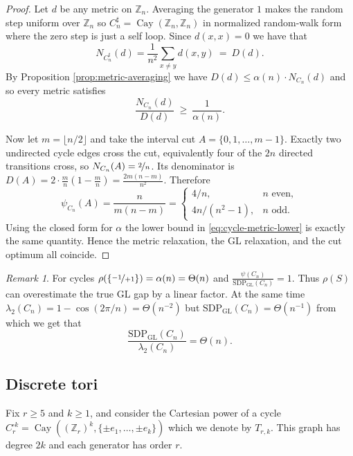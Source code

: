 \documentclass[11pt]{article}
\theoremstyle{definition}
\theoremstyle{remark}
\newtheorem{remark}[theorem]{Remark}
\newcommand{\Z}{\mathbb{Z}}
\newcommand{\Cay}{\operatorname{Cay}}
\newcommand{\gl}{\operatorname{SDP_{GL}}}
\begin{document}
\begin{proof}
Let $d$ be any metric on $\Z_n$. Averaging the generator $1$ makes the random step uniform over $\Z_n$ so $C_n^\sharp=\Cay(\Z_n,\Z_n)$ in normalized random-walk form where the zero step is just a self loop. Since $d(x,x)=0$ we have that
\[
  N_{C_n^\sharp}(d)
  =\frac1{n^2}\sum_{x \neq y}d(x,y) ~=~ D(d).
\]
By Proposition \ref{prop:metric-averaging} we have $D(d) \leq \alpha(n) \cdot N_{C_n}(d)$ and so every metric satisfies
\begin{equation}\label{eq:cycle-metric-lower}
  \frac{N_{C_n}(d)}{D(d)}
  ~\geq~\frac{1}{\alpha(n)}.
\end{equation}

Now let $m=\lfloor n/2\rfloor$ and take the interval cut $A=\{0,1,\ldots,m-1\}$. Exactly two undirected cycle edges cross the cut, equivalently four of the $2n$ directed transitions cross, so $N_{C_n}(A)=\nicefrac{2}{n}$. Its denominator is $D(A) = 2 \cdot \frac{m}{n} \left(1-\frac{m}{n}\right) = \frac{2m(n-m)}{n^2}$.
Therefore
\[
  \psi_{C_n}(A)=\frac{n}{m(n-m)}
  =
  \begin{cases}
    4/n,&n\text{ even},\\[3pt]
    4n/(n^2-1),&n\text{ odd}.
  \end{cases}
\]
Using the closed form for $\alpha$ the lower bound in \eqref{eq:cycle-metric-lower} is exactly the same quantity. Hence the metric relaxation, the GL relaxation, and the cut optimum all coincide.
\end{proof}

\begin{remark}
\label{remark:gaps}
For cycles $\rho(\{\nicefrac{-1}{+1}\})=\alpha(n)=\Theta(n)$ and $\frac{\psi(C_n)}{\gl(C_n)}=1$. Thus $\rho(S)$ can overestimate the true GL gap by a linear factor. At the same time $\lambda_2(C_n)=1-\cos(2\pi/n)=\Theta(n^{-2})$ but $\gl(C_n)=\Theta(n^{-1})$ from which we get that
\[
  \frac{\gl(C_n)}{\lambda_2(C_n)}=\Theta(n).
\]
\end{remark}



\subsection{Discrete tori}\label{subsec:tori}

Fix $r\ge5$ and $k\ge1$, and consider the Cartesian power of a cycle $C_r^{\square k}
  =\Cay((\Z_r)^k,\{\pm e_1,\ldots,\pm e_k\})$ which we denote by $T_{r,k}$. 
This graph has degree $2k$ and each generator has order $r$. 
\end{document}
